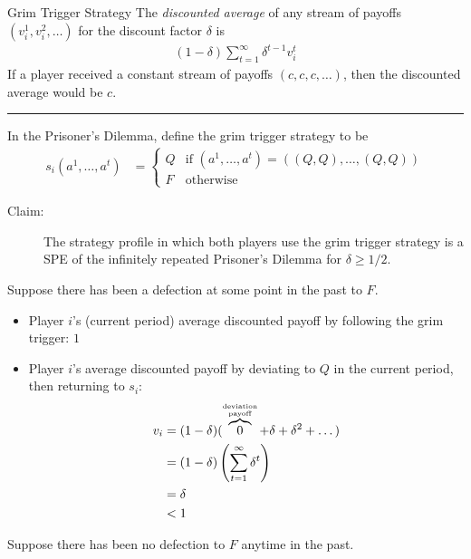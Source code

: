 \documentclass[10pt]{extarticle}
\begin{document}
  \begin{problem}{Grim Trigger Strategy}
    The \textit{discounted average} of any stream of payoffs $(v_{i}^{1},v_{i}^{2},\dots)$ for the discount factor $\delta$ is
    \begin{align*}
      (1-\delta)\sum_{t=1}^{\infty}\delta^{t-1}v_{i}^t
    \end{align*}
    If a player received a constant stream of payoffs $(c,c,c,\dots)$, then the discounted average would be $c$.\\
    \vspace{4pt}
    \rule{\textwidth}{0.4pt}
    \vspace{4pt}
    In the Prisoner's Dilemma, define the grim trigger strategy to be
    \begin{align*}
      s_{i}(a^1,\dots,a^t) &= \begin{cases}
        Q&\text{if } (a^1,\dots,a^t) = ((Q,Q),\dots,(Q,Q))\\
        F&\text{otherwise}
      \end{cases}
    \end{align*}
    \begin{description}
      \item[Claim:] The strategy profile in which both players use the grim trigger strategy is a SPE of the infinitely repeated Prisoner's Dilemma for $\delta \geq 1/2$.
    \end{description}
    Suppose there has been a defection at some point in the past to $F$.
    \begin{itemize}
      \item Player $i$'s (current period) average discounted payoff by following the grim trigger: $1$
      \item Player $i$'s average discounted payoff by deviating to $Q$ in the current period, then returning to $s_i$:
        \begin{align*}
          v_i &= (1-\delta)(\overbrace{0}^{\substack{\text{\tiny deviation}\\\text{\tiny payoff}}} + \delta + \delta^2 + \dots) \\
              &= (1-\delta)\left(\sum_{t=1}^{\infty}\delta^t\right)\\
              &= \delta\\
              &< 1
        \end{align*}
    \end{itemize}
    Suppose there has been no defection to $F$ anytime in the past.
    \begin{itemize}

\end{itemize}
\end{problem}
\end{document}
